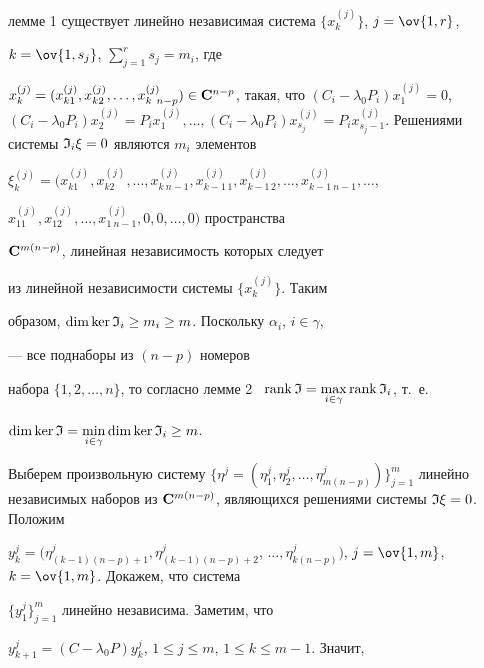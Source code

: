 лемме 1 существует линейно независимая система $\{x^{(j)}_k\}$, $j=\ov{1,r}$, 


$k=\ov{1,s_j}$, $\sum\limits^r_{j=1}s_j=m_i$, где 


$x^{(j)}_k=(x^{(j)}_{k1},x^{(j)}_{k2},\dotsc,x^{(j)}_{k\ n-p})\in \bold 


C^{n-p}$, такая, что $(C_i-\lambda_0 P_i)x^{(j)}_1=0$, $(C_i-\lambda_0 


P_i)x^{(j)}_2=P_i x^{(j)}_1,\dotsc,(C_i-\lambda_0 P_i)x^{(j)}_{s_j}= P_i 


x^{(j)}_{s_j-1}$. Решениями системы $\frak I_i\xi=0$ являются $m_i$ элементов 


$\xi^{(j)}_k=(x^{(j)}_{k1}, x^{(j)}_{k2},..., x^{(j)}_{k\ n-1}, 


x^{(j)}_{k-1\, 1},x^{(j)}_{k-1\, 2},..., x^{(j)}_{k-1\ n-1},\dotsc$, 




$x^{(j)}_{11},x^{(j)}_{12},\dotsc,x^{(j)}_{1\ n-1},0,0,\dotsc,0)$ пространства 


$\bold C^{m(n-p)}$, линейная независимость которых следует 


из линейной независимости системы $\{x^{(j)}_k\}$. Таким 


образом, $\dim\ker\frak I_i\ge m_i\ge m$. Поскольку $\alpha_i$, $i\in\gamma$, 


--- все поднаборы из $(n-p)$ номеров 


набора $\{1,2,\dotsc,n\}$, то согласно лемме 2 \ $\rank\frak 


I=\max\limits_{i\in\gamma}\rank\frak I_i$, т.\, е. 


$\dim\ker\frak I=\min\limits_{i\in\gamma} \dim\ker\frak I_i\ge m$. 


 


Выберем произвольную систему $\{\eta^j=(\eta^j_1,\eta^j_2,\dotsc, 


\eta^j_{m(n-p)})\}^m_{j=1}$ линейно независимых наборов из $\bold 


C^{m(n-p)}$, являющихся решениями системы $\frak I\xi=0$. Положим 


$y^j_k=(\eta^j_{(k-1)(n-p)+1}, \eta^j_{(k-1)(n-p)+2}$, $\dotsc, 




\eta^j_{k(n-p)})$, $j=\ov{1,m}$, $k=\ov{1,m}$. Докажем, что система 


$\{y^j_1\}^m_{j=1}$ линейно независима. Заметим, что 


$y^j_{k+1}=(C-\lambda_0P)y^j_k$, $1\le j\le m$, $1\le k\le m-1$. Значит, 


